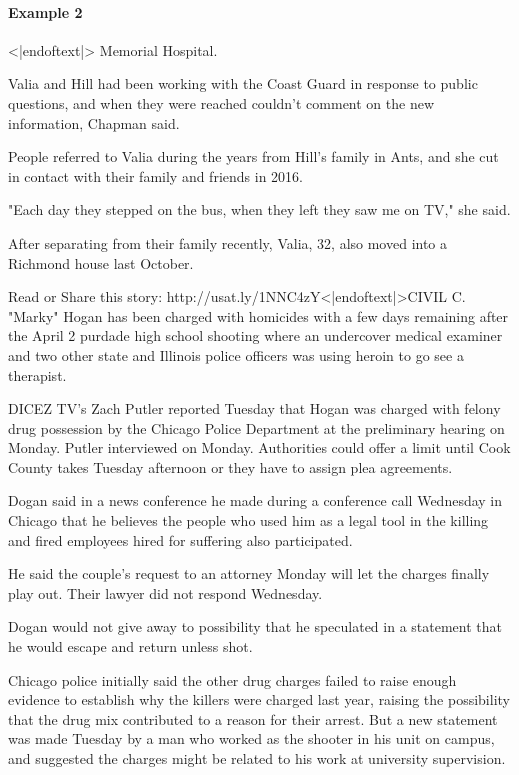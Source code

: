 \documentclass{article} %
\begin{document}
{\begin{appendices}
{}

\paragraph{Example 2}
{\selectfont
<|endoftext|> Memorial Hospital.

Valia and Hill had been working with the Coast Guard in response to public questions, and when they were reached couldn't comment on the new information, Chapman said.

People referred to Valia during the years from Hill's family in Ants, and she cut in contact with their family and friends in 2016.

"Each day they stepped on the bus, when they left they saw me on TV," she said.

After separating from their family recently, Valia, 32, also moved into a Richmond house last October.

Read or Share this story: http://usat.ly/1NNC4zY<|endoftext|>CIVIL C. "Marky" Hogan has been charged with homicides with a few days remaining after the April 2 purdade high school shooting where an undercover medical examiner and two other state and Illinois police officers was using heroin to go see a therapist.

DICEZ TV's Zach Putler reported Tuesday that Hogan was charged with felony drug possession by the Chicago Police Department at the preliminary hearing on Monday. Putler interviewed on Monday. Authorities could offer a limit until Cook County takes Tuesday afternoon or they have to assign plea agreements.

Dogan said in a news conference he made during a conference call Wednesday in Chicago that he believes the people who used him as a legal tool in the killing and fired employees hired for suffering also participated.

He said the couple's request to an attorney Monday will let the charges finally play out. Their lawyer did not respond Wednesday.

Dogan would not give away to possibility that he speculated in a statement that he would escape and return unless shot.

Chicago police initially said the other drug charges failed to raise enough evidence to establish why the killers were charged last year, raising the possibility that the drug mix contributed to a reason for their arrest. But a new statement was made Tuesday by a man who worked as the shooter in his unit on campus, and suggested the charges might be related to his work at university supervision.

}
\end{appendices}}
\end{document}
